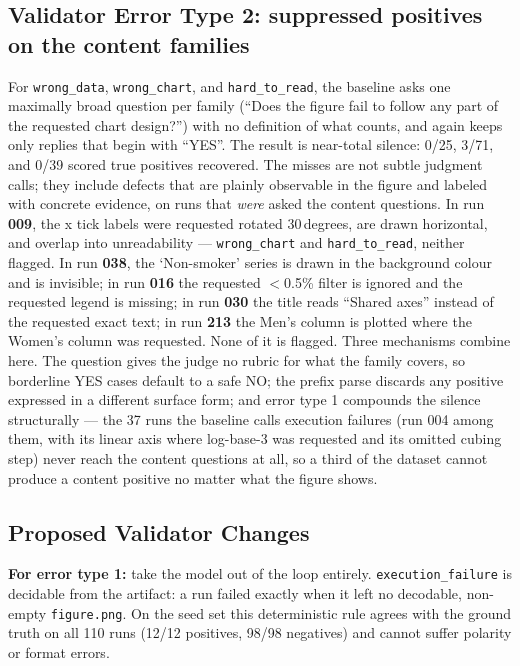 \documentclass[11pt]{article}
\begin{document}
\subsection{Validator Error Type 2: suppressed positives on the content
families}
For \texttt{wrong\_data}, \texttt{wrong\_chart}, and \texttt{hard\_to\_read},
the baseline asks one maximally broad question per family (``Does the figure
fail to follow any part of the requested chart design?'') with no definition
of what counts, and again keeps only replies that begin with ``YES''. The
result is near-total silence: 0/25, 3/71, and 0/39 scored true positives
recovered. The misses are not subtle judgment calls; they include defects
that are plainly observable in the figure and labeled with concrete
evidence, on runs that \emph{were} asked the content questions. In run
\textbf{009}, the x tick labels were requested rotated 30\,degrees, are
drawn horizontal, and overlap into unreadability --- \texttt{wrong\_chart}
and \texttt{hard\_to\_read}, neither flagged. In run \textbf{038}, the
`Non-smoker' series is drawn in the background colour and is invisible; in
run \textbf{016} the requested $<$0.5\% filter is ignored and the requested
legend is missing; in run \textbf{030} the title reads ``Shared axes''
instead of the requested exact text; in run \textbf{213} the Men's column
is plotted where the Women's column was requested. None of it is flagged.
Three mechanisms combine here. The question gives the judge no rubric for
what the family covers, so borderline YES cases default to a safe NO; the
prefix parse discards any positive expressed in a different surface form;
and error type 1 compounds the silence structurally --- the 37 runs the
baseline calls execution failures (run 004 among them, with its linear axis
where log-base-3 was requested and its omitted cubing step) never reach the
content questions at all, so a third of the dataset cannot produce a
content positive no matter what the figure shows.

\subsection{Proposed Validator Changes}
\textbf{For error type 1:} take the model out of the loop entirely.
\texttt{execution\_failure} is decidable from the artifact: a run failed
exactly when it left no decodable, non-empty \texttt{figure.png}. On the
seed set this deterministic rule agrees with the ground truth on all 110
runs (12/12 positives, 98/98 negatives) and cannot suffer polarity or
format errors.
\end{document}
